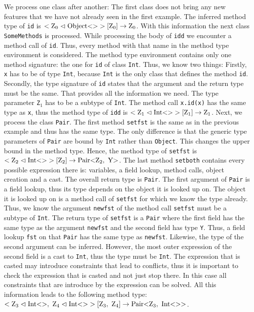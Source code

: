 We process one class after another: The first class does not bring any new features that we have not already seen in the first example. The inferred method type of \verb|id| is $<\text{Z}_{0} \vartriangleleft \text{Object} \text{<}  \text{>}>[\text{Z}_{0}] \to \text{Z}_{0}$.
With this information the next class \verb|SomeMethods| is processed. While processing the body of \verb|idd| we encounter a method call of \verb|id|. Thus, every method with that name in the method type environment is considered. The method type environment
contains only one method signature: the one for \verb|id| of class \verb|Int|. Thus, we know two things: Firstly, \verb|x| has to be of type \verb|Int|, because \verb|Int| is the only class that defines the method \verb|id|. Secondly, the type signature of \verb|id| states that the argument and the return type must be the same.
That provides all the information we need. The type parameter \verb|Z|$_1$ has to be a subtype of \verb|Int|. The method call \verb|x.id(x)| has the same type as \verb|x|, thus the method type of \verb|idd| is $<\text{Z}_{1} \vartriangleleft \text{Int} \text{<}  \text{>}>[\text{Z}_{1}] \to \text{Z}_{1}$.
Next, we process the class \verb|Pair|. The first method \verb|setfst| is the same as in the previous example and thus has the same type. The only difference is that the generic type parameters of \verb|Pair| are bound by \verb|Int| rather than \verb|Object|.
This changes the upper bound in the method type. Hence, the method type of \verb|setfst| is $<\text{Z}_{2} \vartriangleleft \text{Int} \text{<}  \text{>}>[\text{Z}_{2}] \to \text{Pair} \text{<} \text{Z}_{2}, \ \text{Y} \text{>}$.
The last method \verb|setboth| contains every possible expression there is: variables, a field lookup, method calls, object creation and a cast.
The overall return type is \verb|Pair|. The first argument of \verb|Pair| is a field lookup, thus its type depends on the object it is looked up on. The object it is looked up on is a method call of \verb|setfst| for which we know the type already. Thus, we know the argument \verb|newfst| of the method call \verb|setfst| must be a subtype of \verb|Int|. The return type of \verb|setfst| is a \verb|Pair| where the first field has the same type as the argument \verb|newfst| and the second field has type \verb|Y|.
Thus, a field lookup \verb|fst| on that \verb|Pair| has the same type as \verb|newfst|. Likewise, the type of the second argument can be inferred. However, the most outer expression of the second field is a cast to \verb|Int|, thus the type must be \verb|Int|.
The expression that is casted may introduce constraints that lead to conflicts, thus it is important to check the expression that is casted and not just stop there. In this case all constraints that are introduce by the expression can be solved.
All this information leads to the following method type: $<\xa{Z}{3} \vartriangleleft \nvtt{Int}{}, \ \xa{Z}{4} \vartriangleleft \nvtt{Int}{}>[\xa{Z}{3}, \ \xa{Z}{4}] \to \nvtt{Pair}{\xa{Z}{3}, \ \nvtt{Int}{}}$.
